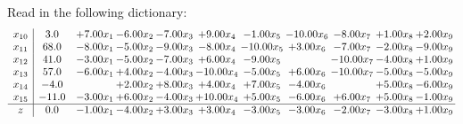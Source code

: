 \documentclass[9pt]{article}
\begin{document}
Read in the following dictionary:
\[\begin{array}{c| c c@{\hskip 2pt} c@{\hskip 2pt} c@{\hskip 2pt} c@{\hskip 2pt} c@{\hskip 2pt} c@{\hskip 2pt} c@{\hskip 2pt} c@{\hskip 2pt} c@{\hskip 2pt} }
 x_{10}   &  3.0 & +  7.00 x_{1} & -6.00 x_{2} & -7.00 x_{3} & +  9.00 x_{4} & -1.00 x_{5} & -10.00 x_{6} & -8.00 x_{7} & +  1.00 x_{8} & +  2.00 x_{9}\\
 x_{11}   &  68.0 & -8.00 x_{1} & -5.00 x_{2} & -9.00 x_{3} & -8.00 x_{4} & -10.00 x_{5} & +  3.00 x_{6} & -7.00 x_{7} & -2.00 x_{8} & -9.00 x_{9}\\
 x_{12}   &  41.0 & -3.00 x_{1} & -5.00 x_{2} & -7.00 x_{3} & +  6.00 x_{4} & -9.00 x_{5} &   & -10.00 x_{7} & -4.00 x_{8} & +  1.00 x_{9}\\
 x_{13}   &  57.0 & -6.00 x_{1} & +  4.00 x_{2} & -4.00 x_{3} & -10.00 x_{4} & -5.00 x_{5} & +  6.00 x_{6} & -10.00 x_{7} & -5.00 x_{8} & -5.00 x_{9}\\
 x_{14}   &  -4.0  &   & +  2.00 x_{2} & +  8.00 x_{3} & +  4.00 x_{4} & +  7.00 x_{5} & -4.00 x_{6} &   & +  5.00 x_{8} & -6.00 x_{9}\\
 x_{15}   &  -11.0 & -3.00 x_{1} & +  6.00 x_{2} & -4.00 x_{3} & + 10.00 x_{4} & +  5.00 x_{5} & -6.00 x_{6} & +  6.00 x_{7} & +  5.00 x_{8} & -1.00 x_{9}\\
\hline
z    &  0.0 & -1.00 x_{1} & -4.00 x_{2} & +  3.00 x_{3} & +  3.00 x_{4} & -3.00 x_{5} & -3.00 x_{6} & -2.00 x_{7} & -3.00 x_{8} & +  1.00 x_{9}\\
\end{array}\]
\end{document}
